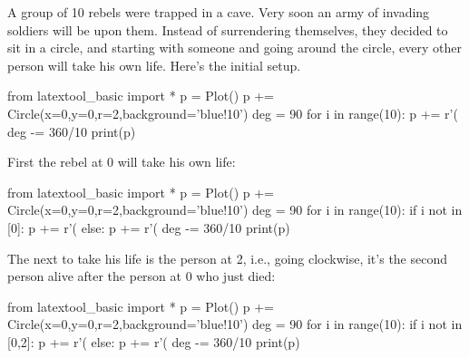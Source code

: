 A group of 10 rebels were trapped in a cave. Very soon an army of invading soldiers will be upon them. Instead
of surrendering themselves, they decided to sit in a circle, and starting with someone and going around the
circle, every other person will take his own life. Here's the initial setup.
\begin{python}
from latextool_basic import *
p = Plot()
p += Circle(x=0,y=0,r=2,background='blue!10')
deg = 90
for i in range(10):
    p += r'\draw (%
    deg -= 360/10
print(p)
\end{python}
  
First the rebel at 0 will take his own life:
\begin{python}
from latextool_basic import *
p = Plot()
p += Circle(x=0,y=0,r=2,background='blue!10')
deg = 90
for i in range(10):
    if i not in [0]:
        p += r'\draw (%
    else:
        p += r'\draw (%
    deg -= 360/10
print(p)
\end{python}

The next to take his life is the person at 2, i.e., going clockwise, it's
the 
second person alive after the person at 0 who just died:
\begin{python}
from latextool_basic import *
p = Plot()
p += Circle(x=0,y=0,r=2,background='blue!10')
deg = 90
for i in range(10):
    if i not in [0,2]:
        p += r'\draw (%
    else:
        p += r'\draw (%
    deg -= 360/10
print(p)
\end{python}

